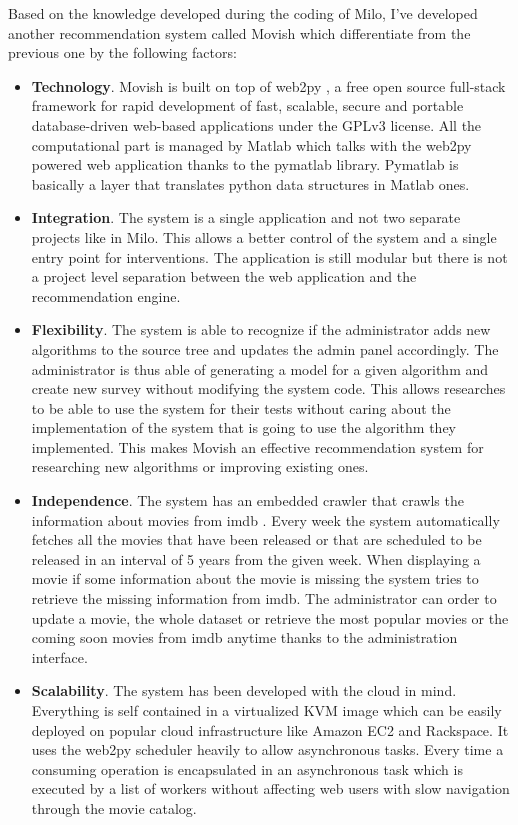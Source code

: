 Based on the knowledge developed during the coding of Milo, I've developed another recommendation system called Movish which differentiate from the previous one by the following factors:
\begin{itemize}
\item \textbf{Technology}. Movish is built on top of web2py \cite{web2py}, a free open source full-stack framework for rapid development of fast, scalable, secure and portable database-driven web-based applications under the GPLv3\cite{gplv3} license. All the computational part is managed by Matlab \cite{matlab} which talks with the web2py powered web application thanks to the pymatlab \cite{pymatlab} library. Pymatlab is basically a layer that translates python data structures in Matlab ones. 
\item \textbf{Integration}. The system is a single application and not two separate projects like in Milo. This allows a better control of the system and a single entry point for interventions. The application is still modular but there is not a project level separation between the web application and the recommendation engine.
\item \textbf{Flexibility}. The system is able to recognize if the administrator adds new algorithms to the source tree and updates the admin panel accordingly. The administrator is thus able of generating a model for a given algorithm and create new survey without modifying the system code. This allows researches to be able to use the system for their tests without caring about the implementation of the system that is going to use the algorithm they implemented. This makes Movish an effective recommendation system for researching new algorithms or improving existing ones. 
\item \textbf{Independence}. The system has an embedded crawler that crawls the information about movies from imdb \cite{imdb}. Every week the system automatically fetches all the movies that have been released or that are scheduled to be released in an interval of 5 years from the given week. When displaying a movie if some information about the movie is missing the system tries to retrieve the missing information from imdb. The administrator can order to update a movie, the whole dataset or retrieve the most popular movies or the coming soon movies from imdb anytime thanks to the administration interface.
\item \textbf{Scalability}. The system has been developed with the cloud in mind. Everything is self contained in a virtualized KVM image which can be easily deployed on popular cloud infrastructure like Amazon EC2 and Rackspace. It uses the web2py scheduler heavily to allow asynchronous tasks. Every time a consuming operation is encapsulated in an asynchronous task which is executed by a list of workers without affecting web users with slow navigation through the movie catalog. 
\end{itemize}


